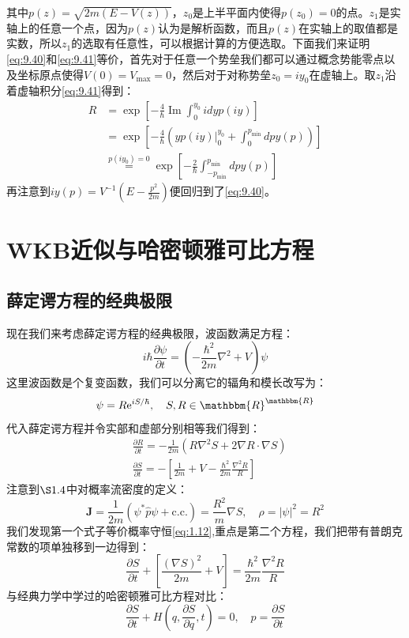 \documentclass[a4paper,zihao=-4,linespread=1]{ctexrep}
\begin{document}
	其中$p(z)=\sqrt{2m(E-V(z))}$，$z_0$是上半平面内使得$p(z_0)=0$的点。$z_1$是实轴上的任意一个点，因为$p(z)$认为是解析函数，而且$p(z)$在实轴上的取值都是实数，所以$z_1$的选取有任意性，可以根据计算的方便选取。下面我们来证明\ref{eq:9.40}和\ref{eq:9.41}等价，首先对于任意一个势垒我们都可以通过概念势能零点以及坐标原点使得$V(0)=V_{\max}=0$，然后对于对称势垒$z_0=iy_0$在虚轴上。取$z_1$沿着虚轴积分\ref{eq:9.41}得到：
	\begin{align*}
		R&=\exp \left[-\frac{4}{\hbar} \operatorname{Im} \int_{0}^{y_{0}} i d y p(i y)\right]\\
		&=\exp\left[-\frac{4}{\hbar}\left(\left.y p(i y)\right|_{0} ^{y_{0}}+\int_{0}^{p_{\min }} d p y(p)\right)\right]\\
		&\overset{p(iy_0)=0}{=}\exp\left[-\frac{2}{\hbar}\int_{-p_{\min}}^{p_{\min }} d p y(p)\right]
	\end{align*}
	再注意到$iy(p)=V^{-1}\left(E-\frac{p^{2}}{2 m}\right)$便回归到了\ref{eq:9.40}。
	
	\section{WKB近似与哈密顿雅可比方程}
	\subsection*{薛定谔方程的经典极限}
	现在我们来考虑薛定谔方程的经典极限，波函数满足方程：
	\begin{equation}
		i\hbar\frac{\partial\psi}{\partial t}=\left(-\frac{\hbar^2}{2m}\nabla^2+V\right)\psi
	\end{equation}
	这里波函数是个复变函数，我们可以分离它的辐角和模长改写为：
	\[\psi=R\mathrm{e}^{iS/\hbar},\quad S,R\in\mathbbm{R}^{\mathbbm{R}}\]
	代入薛定谔方程并令实部和虚部分别相等我们得到：
	\begin{align}
		&\frac{\partial R}{\partial t}=-\frac{1}{2m}\left(R\nabla^2S+2\nabla R\cdot \nabla S\right)\\
		&\frac{\partial S}{\partial t}=-\left[\frac{1}{2m}+V-\frac{\hbar^2}{2m}\frac{\nabla^2 R}{R}\right]
	\end{align}
	注意到$\S1.4$中对概率流密度的定义：
	\[\mathbf{J}=\frac{1}{2m}\left(\psi^*\hat p\psi+\mathrm{c.c.}\right)=\frac{R^2}{m}\nabla S,\quad\rho=|\psi|^2=R^2\]
	我们发现第一个式子等价概率守恒\ref{eq:1.12},重点是第二个方程，我们把带有普朗克常数的项单独移到一边得到：
	\begin{equation}
		\frac{\partial S}{\partial t}+\left[\frac{(\nabla S)^2}{2m}+V\right]=\frac{\hbar^2}{2m}\frac{\nabla^2R}{R}
	\end{equation}
	与经典力学中学过的哈密顿雅可比方程对比：
	$$\frac{\partial S}{\partial t}+ H(q,\frac{\partial S}{\partial q},t)=0,\quad p=\frac{\partial S}{\partial t}$$
\end{document}
